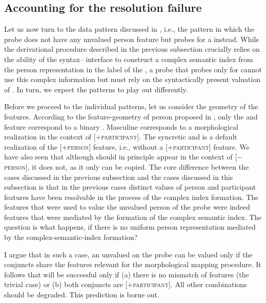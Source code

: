 \documentclass[output=paper,modfontsnewtxmath,hidelinks]{langscibook}
\begin{document}
\subsection{Accounting for the resolution failure}

Let us now turn to the data pattern discussed in , i.e., the pattern in which the probe does not have any unvalued person feature but probes for a  instead. While the derivational procedure described in the previous subsection crucially relies on the ability of the syntax-- interface to construct a complex semantic index from the person representation in the label of the , a probe that probes only for  cannot use this complex information but must rely on the syntactically present valuation of . In turn, we expect the  patterns to play out differently. 

Before we proceed to the individual patterns, let us consider the geometry of the  features. According to the feature-geometry of person proposed in , only the   and  feature correspond to a binary . Masculine  corresponds to a morphological realization in the context of [$+$\textsc{participant}]. The syncretic   and   is a default realization of the [$+$\textsc{person}] feature, i.e., without a  [$+$\textsc{participant}] feature. We have also seen that although  should in principle appear in the context of [$-$\textsc{person}], it does not, as it only can be copied. The core difference between the cases discussed in the previous subsection and the cases discussed in this subsection is that in the previous cases distinct values of person and participant features have been resolvable in the process of the complex index formation. The features that were used to value the unvalued person of the probe were indeed features that were mediated by the formation of the complex semantic index. The question is what happens, if there is no uniform person representation mediated by the complex-semantic-index formation?

I argue that in such a case, an unvalued  on the probe can be valued only if the conjuncts share the features relevant for the morphological mapping procedure. It follows that  will be successful only if (a) there is no mismatch of  features (the trivial case) or (b) both conjuncts are [$+$\textsc{participant}]. All other combinations should be degraded. This prediction is borne out.
\end{document}
